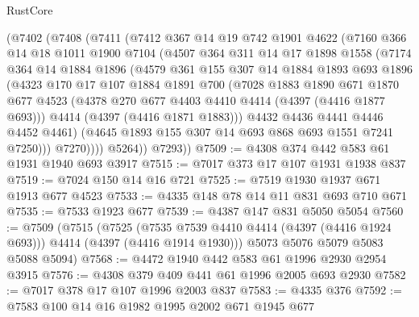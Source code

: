 \begin{lexlean}{RustCore}
\begin{coremodule}
        (@7402
          (@7408
            (@7411
              (@7412
                @367
                @14
                @19
                @742
                @1901
                @4622
                (@7160
                  @366
                  @14
                  @18
                  @1011
                  @1900
                  @7104
                  (@4507
                    @364
                    @311
                    @14
                    @17
                    @1898
                    @1558
                    (@7174
                      @364
                      @14
                      @1884
                      @1896
                      (@4579
                        @361
                        @155
                        @307
                        @14
                        @1884
                        @1893
                        @693
                        @1896
                        (@4323
                          @170
                          @17
                          @107
                          @1884
                          @1891
                          @700
                          (@7028
                            @1883
                            @1890
                            @671
                            @1870
                            @677
                            @4523
                            (@4378 @270 @677 @4403 @4410 @4414 (@4397 (@4416 @1877 @693)))
                            @4414
                            (@4397 (@4416 @1871 @1883)))
                          @4432
                          @4436
                          @4441
                          @4446
                          @4452
                          @4461)
                        (@4645 @1893 @155 @307 @14 @693 @868 @693 @1551 @7241 @7250)))
                    @7270))))
            @5264))
        @7293))
@7509 := @4308 @374 @442 @583 @61 @1931 @1940 @693 @3917
@7515 := @7017 @373 @17 @107 @1931 @1938 @837
@7519 := @7024 @150 @14 @16 @721
@7525 := @7519 @1930 @1937 @671 @1913 @677 @4523
@7533 := @4335 @148 @78 @14 @11 @831 @693 @710 @671
@7535 := @7533 @1923 @677
@7539 := @4387 @147 @831 @5050 @5054
@7560 := @7509
    (@7515
      (@7525 (@7535 @7539 @4410 @4414 (@4397 (@4416 @1924 @693))) @4414 (@4397 (@4416 @1914 @1930)))
      @5073
      @5076
      @5079
      @5083
      @5088
      @5094)
@7568 := @4472 @1940 @442 @583 @61 @1996 @2930 @2954 @3915
@7576 := @4308 @379 @409 @441 @61 @1996 @2005 @693 @2930
@7582 := @7017 @378 @17 @107 @1996 @2003 @837
@7583 := @4335 @376
@7592 := @7583 @100 @14 @16 @1982 @1995 @2002 @671 @1945 @677

\end{coremodule}
\end{lexlean}

